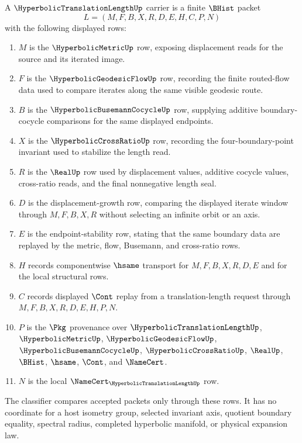 \begin{definition}
\label{def:hyperbolic-translation-length-carrier}
A $\HyperbolicTranslationLengthUp$ carrier is a finite $\BHist$ packet
$$
L=(M,F,B,X,R,D,E,H,C,P,N)
$$
with the following displayed rows:
\begin{enumerate}
\item $M$ is the $\HyperbolicMetricUp$ row, exposing displacement reads for the source and its iterated image.
\item $F$ is the $\HyperbolicGeodesicFlowUp$ row, recording the finite routed-flow data used to compare iterates along the same visible geodesic route.
\item $B$ is the $\HyperbolicBusemannCocycleUp$ row, supplying additive boundary-cocycle comparisons for the same displayed endpoints.
\item $X$ is the $\HyperbolicCrossRatioUp$ row, recording the four-boundary-point invariant used to stabilize the length read.
\item $R$ is the $\RealUp$ row used by displacement values, additive cocycle values, cross-ratio reads, and the final nonnegative length seal.
\item $D$ is the displacement-growth row, comparing the displayed iterate window through $M,F,B,X,R$ without selecting an infinite orbit or an axis.
\item $E$ is the endpoint-stability row, stating that the same boundary data are replayed by the metric, flow, Busemann, and cross-ratio rows.
\item $H$ records componentwise $\hsame$ transport for $M,F,B,X,R,D,E$ and for the local structural rows.
\item $C$ records displayed $\Cont$ replay from a translation-length request through $M,F,B,X,R,D,E,H,P,N$.
\item $P$ is the $\Pkg$ provenance over $\HyperbolicTranslationLengthUp$, $\HyperbolicMetricUp$, $\HyperbolicGeodesicFlowUp$, $\HyperbolicBusemannCocycleUp$, $\HyperbolicCrossRatioUp$, $\RealUp$, $\BHist$, $\hsame$, $\Cont$, and $\NameCert$.
\item $N$ is the local $\NameCert_{\HyperbolicTranslationLengthUp}$ row.
\end{enumerate}
The classifier compares accepted packets only through these rows. It has no coordinate for a host isometry group, selected invariant axis, quotient boundary equality, spectral radius, completed hyperbolic manifold, or physical expansion law.
\end{definition}

